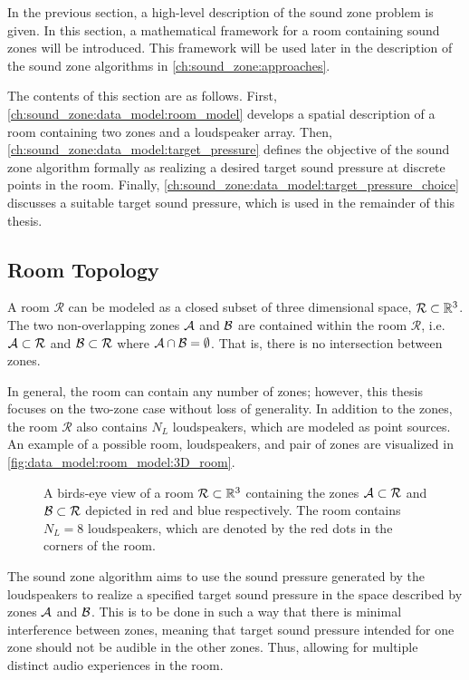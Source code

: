 In the previous section, a high-level description of the sound zone problem is given.
In this section, a mathematical framework for a room containing sound zones will be introduced.
This framework will be used later in the description of the sound zone algorithms in \autoref{ch:sound_zone:approaches}.

The contents of this section are as follows.
First, \autoref{ch:sound_zone:data_model:room_model} develops a spatial description of a room containing
two zones and a loudspeaker array.
Then, \autoref{ch:sound_zone:data_model:target_pressure} defines the objective of the sound zone algorithm formally
as realizing a desired target sound pressure at discrete points in the room.
Finally, \autoref{ch:sound_zone:data_model:target_pressure_choice} discusses a suitable target sound pressure, which is used in the remainder of this thesis.

\subsection{Room Topology}
\label{ch:sound_zone:data_model:room_model}
A room $\mathcal{R}$ can be modeled as a closed subset of three dimensional space, $\mathcal{R} \subset \mathbb{R}^{3}$.
The two non-overlapping zones $\mathcal{A}$ and $\mathcal{B}$ are contained within the room $\mathcal{R}$, 
i.e. $\mathcal{A} \subset \mathcal{R}$ and $\mathcal{B} \subset \mathcal{R}$ where $\mathcal{A} \cap \mathcal{B} = \emptyset$.
That is, there is no intersection between zones.

In general, the room can contain any number of zones; however, this thesis focuses on the two-zone case without loss of generality. 
In addition to the zones, the room $\mathcal{R}$ also contains $N_L$ loudspeakers, which are modeled as point sources.
An example of a possible room, loudspeakers, and pair of zones are visualized in \autoref{fig:data_model:room_model:3D_room}.

\begin{figure}
    \centering
    
    \caption{A birds-eye view of a room $\mathcal{R}\subset \mathbb{R}^{3}$ containing the zones $\mathcal{A}\subset\mathcal{R}$ 
    and $\mathcal{B}\subset\mathcal{R}$ depicted in red and blue respectively. 
    The room contains $N_L = 8$ loudspeakers, which are denoted by the red dots in the corners of the room.}
    \label{fig:data_model:room_model:3D_room}
\end{figure}

The sound zone algorithm aims to use the sound pressure generated by the loudspeakers to realize a specified target sound pressure
in the space described by zones $\mathcal{A}$ and $\mathcal{B}$.
This is to be done in such a way that there is minimal interference between zones, 
meaning that target sound pressure intended for one zone should not be audible in the other zones.
Thus, allowing for multiple distinct audio experiences in the room.

